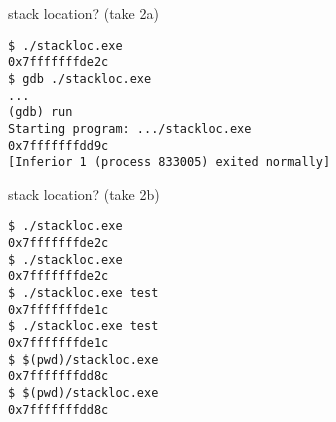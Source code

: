 
\begin{frame}[fragile,label=stackLoc3a]{stack location? (take 2a)}
\begin{Verbatim}[fontsize=\fontsize{9}{10}\selectfont]
$ ./stackloc.exe 
0x7fffffffde2c
$ gdb ./stackloc.exe
...
(gdb) run
Starting program: .../stackloc.exe 
0x7fffffffdd9c
[Inferior 1 (process 833005) exited normally]
\end{Verbatim}
\end{frame}


\begin{frame}[fragile,label=stackLoc3b]{stack location? (take 2b)}
\begin{Verbatim}[fontsize=\fontsize{9}{10}\selectfont]
$ ./stackloc.exe 
0x7fffffffde2c
$ ./stackloc.exe 
0x7fffffffde2c
$ ./stackloc.exe test
0x7fffffffde1c
$ ./stackloc.exe test
0x7fffffffde1c
$ $(pwd)/stackloc.exe
0x7fffffffdd8c
$ $(pwd)/stackloc.exe
0x7fffffffdd8c
\end{Verbatim}
\end{frame}
